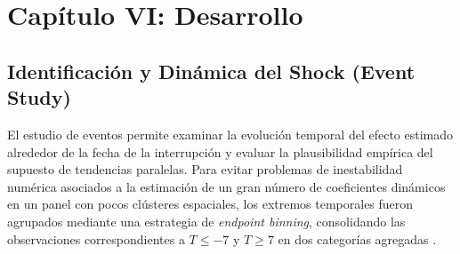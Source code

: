 \newpage
\section{Cap\'itulo VI: Desarrollo}\label{chp:capitulo6}

\subsection{Identificaci\'on y Din\'amica del Shock (Event Study)}
\label{sec:6_1}

El estudio de eventos permite examinar la evoluci\'on temporal del efecto estimado alrededor de la fecha de la interrupci\'on y evaluar la plausibilidad emp\'irica del supuesto de tendencias paralelas. Para evitar problemas de inestabilidad num\'erica asociados a la estimaci\'on de un gran n\'umero de coeficientes din\'amicos en un panel con pocos cl\'usteres espaciales, los extremos temporales fueron agrupados mediante una estrategia de \textit{endpoint binning}, consolidando las observaciones correspondientes a $T \leq -7$ y $T \geq 7$ en dos categor\'ias agregadas \citep{schmidheiny2019event, rambachan2023credible, manski1993identification, ljungqvist2018recursive}.

